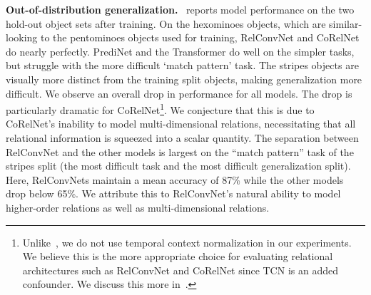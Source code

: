 \textbf{Out-of-distribution generalization.}~ reports model performance on the two hold-out object sets after training. On the hexominoes objects, which are similar-looking to the pentominoes objects used for training, RelConvNet and CoRelNet do nearly perfectly. PrediNet and the Transformer do well on the simpler tasks, but struggle with the more difficult `match pattern' task. The stripes objects are visually more distinct from the training split objects, making generalization more difficult. We observe an overall drop in performance for all models. The drop is particularly dramatic for CoRelNet\footnote{Unlike~\citep{kergNeuralArchitecture2022}, we do not use temporal context normalization in our experiments. We believe this is the more appropriate choice for evaluating relational architectures such as RelConvNet and CoRelNet since TCN is an added confounder. We discuss this more in~.}. We conjecture that this is due to CoRelNet's inability to model multi-dimensional relations, necessitating that all relational information is squeezed into a scalar quantity. The separation between RelConvNet and the other models is largest on the ``match pattern'' task of the stripes split (the most difficult task and the most difficult generalization split). Here, RelConvNets maintain a mean accuracy of 87\% while the other models drop below 65\%. We attribute this to RelConvNet's natural ability to model higher-order relations as well as multi-dimensional relations.

